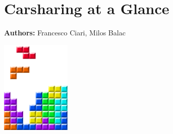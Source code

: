 \chapter{Carsharing at a Glance }
\label{ch:carsharing}

\hfill \textbf{Authors:} Francesco Ciari, Milos Balac

\begin{center} \includegraphics[width=0.25\textwidth, angle=0]{figures/MATSimBook.png} \end{center}


\citet[][]{CiariEtAl_TechRep_IVT_2013, CiariEtAl_TechRep_IVT_2014, CiariEtAl_TRB_2009}


